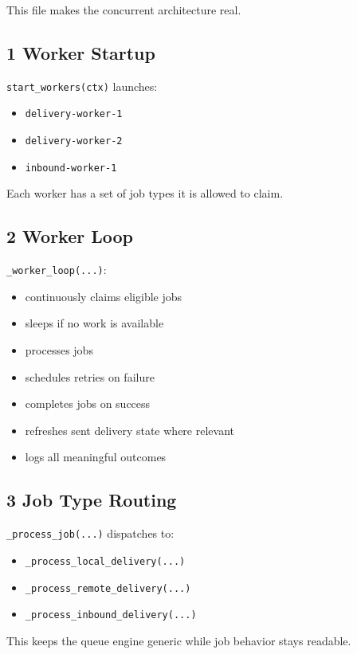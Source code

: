 \documentclass[11pt,a4paper]{article}
\begin{document}
This file makes the concurrent architecture real.

\subsection{1 Worker Startup}

\nolinkurl{start_workers(ctx)} launches:

\begin{itemize}
\item \nolinkurl{delivery-worker-1}
\item \nolinkurl{delivery-worker-2}
\item \nolinkurl{inbound-worker-1}
\end{itemize}

Each worker has a set of job types it is allowed to claim.

\subsection{2 Worker Loop}

\nolinkurl{_worker_loop(...)}:

\begin{itemize}
\item continuously claims eligible jobs
\item sleeps if no work is available
\item processes jobs
\item schedules retries on failure
\item completes jobs on success
\item refreshes sent delivery state where relevant
\item logs all meaningful outcomes
\end{itemize}

\subsection{3 Job Type Routing}

\nolinkurl{_process_job(...)} dispatches to:

\begin{itemize}
\item \nolinkurl{_process_local_delivery(...)}
\item \nolinkurl{_process_remote_delivery(...)}
\item \nolinkurl{_process_inbound_delivery(...)}
\end{itemize}

This keeps the queue engine generic while job behavior stays readable.
\end{document}
